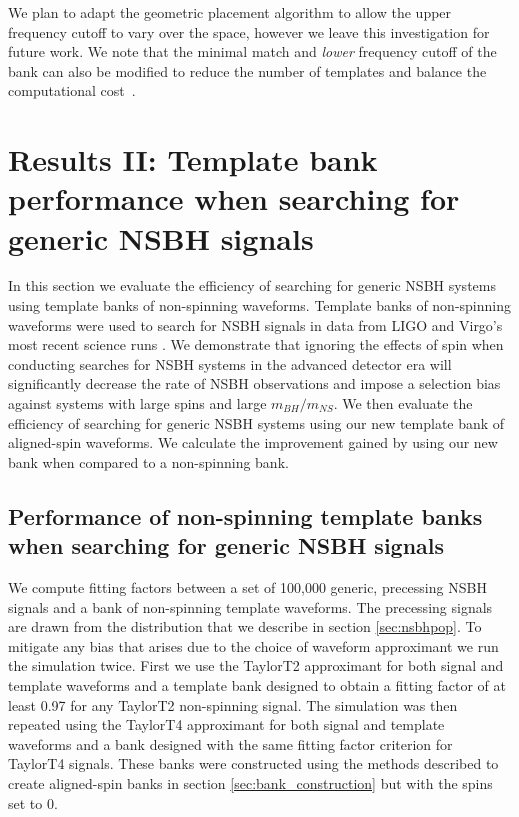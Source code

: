 We plan to adapt the geometric placement algorithm to allow the upper frequency
cutoff to vary over the space, however we leave this investigation for future
work. We note that the minimal match and \emph{lower} frequency cutoff of the
bank can also be modified to reduce the number of templates and balance the
computational cost~\cite{Keppel:2013yia}.

\section{Results II: Template bank performance when searching for generic NSBH 
signals}
\label{sec:resultsII_generic}

In this section we evaluate the efficiency of searching for generic
\ac{NSBH} systems using template banks of non-spinning waveforms. Template 
banks of non-spinning waveforms were used to search for \ac{NSBH} 
signals in data from LIGO and Virgo's most recent science runs 
\cite{Abbott:2009tt,Abbott:2009qj,Abadie:2010yba,Abadie:2011nz}.
We demonstrate that ignoring the effects of spin when conducting searches
for \ac{NSBH} systems in the advanced detector era will significantly decrease
the rate of \ac{NSBH} observations and impose a selection bias against systems
with large spins and large $m_{BH} / m_{NS}$. We then evaluate the efficiency 
of 
searching for generic \ac{NSBH} systems using our new template bank of 
aligned-spin waveforms. We calculate the improvement gained by using our new 
bank when compared to a non-spinning bank.

\subsection{Performance of non-spinning template banks when searching for 
generic
NSBH signals}
\label{sec:non_spinning}

We compute fitting factors between a set of 100,000 generic, precessing
\ac{NSBH} signals and a bank of non-spinning template waveforms. The
precessing signals are drawn from the distribution
that we describe in section \ref{sec:nsbhpop}.
To mitigate any bias that arises due to the choice of waveform approximant
we run the simulation twice. First we use the TaylorT2 approximant for both
signal and template waveforms and a template bank designed to obtain
a fitting factor of at least 0.97 for any TaylorT2 non-spinning signal.
The simulation was then repeated using the TaylorT4 approximant for both signal
and template waveforms and a bank designed with the same fitting factor
criterion for TaylorT4 signals. These banks were constructed using the methods
described to create aligned-spin banks in section \ref{sec:bank_construction}
but with the spins set to 0.

